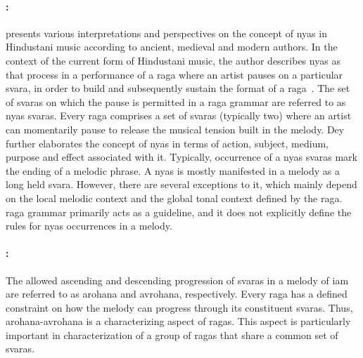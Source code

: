 \paragraph{:} \cite{Dey2008} presents various interpretations and perspectives on the concept of \gls{nyas} in Hindustani music according to ancient, medieval and modern authors. In the context of the current form of Hindustani music, the author describes \gls{nyas} as that process in a performance of a \gls{raga} where an artist pauses on a particular \gls{svara}, in order to build and subsequently sustain the format of a \gls{raga}~\citep[p. 70]{Dey2008}. The set of \glspl{svara} on which the pause is permitted in a \gls{raga} grammar are referred to as \gls{nyas} \glspl{svara}. Every \gls{raga} comprises a set of \glspl{svara} (typically two)  where an artist can momentarily pause to release the musical tension built in the melody. Dey further elaborates the concept of \gls{nyas} in terms of action, subject, medium, purpose and effect associated with it. Typically, occurrence of a \gls{nyas} \glspl{svara} mark the ending of a melodic phrase. A \gls{nyas} is mostly manifested in a melody as a long held \gls{svara}. However, there are several exceptions to it, which mainly depend on the local melodic context and the global tonal context defined by the \gls{raga}. \Gls{raga} grammar primarily acts as a guideline, and it does not explicitly define the rules for \gls{nyas} occurrences in a melody. 

\paragraph{:}

The allowed ascending and descending progression of \glspl{svara} in a melody of \gls{iam} are referred to as \gls{arohana} and \gls{avrohana}, respectively. Every \gls{raga} has a defined constraint on how the melody can progress through its constituent \glspl{svara}. Thus, \gls{arohana}-\gls{avrohana} is a characterizing aspect of \glspl{raga}. This aspect is particularly important in characterization of a group of \glspl{raga} that share a common set of \glspl{svara}. 

